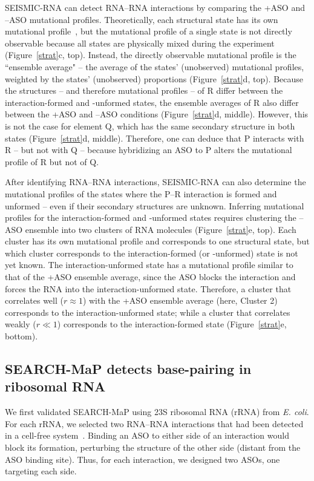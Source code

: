 \documentclass[main.tex]{subfiles}
\begin{document}
SEISMIC-RNA can detect RNA--RNA interactions by comparing the +ASO and --ASO mutational profiles.
Theoretically, each structural state has its own mutational profile~\cite{Sherpa2015}, but the mutational profile of a single state is not directly observable because all states are physically mixed during the experiment (Figure~\ref{strat}c, top).
Instead, the directly observable mutational profile is the ``ensemble average" -- the average of the states' (unobserved) mutational profiles, weighted by the states' (unobserved) proportions (Figure~\ref{strat}d, top).
Because the structures -- and therefore mutational profiles -- of R differ between the interaction-formed and -unformed states, the ensemble averages of R also differ between the +ASO and --ASO conditions (Figure~\ref{strat}d, middle).
However, this is not the case for element Q, which has the same secondary structure in both states (Figure~\ref{strat}d, middle).
Therefore, one can deduce that P interacts with R -- but not with Q -- because hybridizing an ASO to P alters the mutational profile of R but not of Q.

After identifying RNA--RNA interactions, SEISMIC-RNA can also determine the mutational profiles of the states where the P--R interaction is formed and unformed -- even if their secondary structures are unknown.
Inferring mutational profiles for the interaction-formed and -unformed states requires clustering the --ASO ensemble into two clusters of RNA molecules (Figure~\ref{strat}e, top).
Each cluster has its own mutational profile and corresponds to one structural state, but which cluster corresponds to the interaction-formed (or -unformed) state is not yet known.
The interaction-unformed state has a mutational profile similar to that of the +ASO ensemble average, since the ASO blocks the interaction and forces the RNA into the interaction-unformed state.
Therefore, a cluster that correlates well ($r \approx 1$) with the +ASO ensemble average (here, Cluster 2) corresponds to the interaction-unformed state; while a cluster that correlates weakly ($r \ll 1$) corresponds to the interaction-formed state (Figure~\ref{strat}e, bottom).


\subsection{SEARCH-MaP detects base-pairing in ribosomal RNA}

We first validated SEARCH-MaP using 23S ribosomal RNA (rRNA) from \textit{E. coli}.
For each rRNA, we selected two RNA--RNA interactions that had been detected in a cell-free system~\cite{Mustoe2019}.
Binding an ASO to either side of an interaction would block its formation, perturbing the structure of the other side (distant from the ASO binding site).
Thus, for each interaction, we designed two ASOs, one targeting each side.
\end{document}
